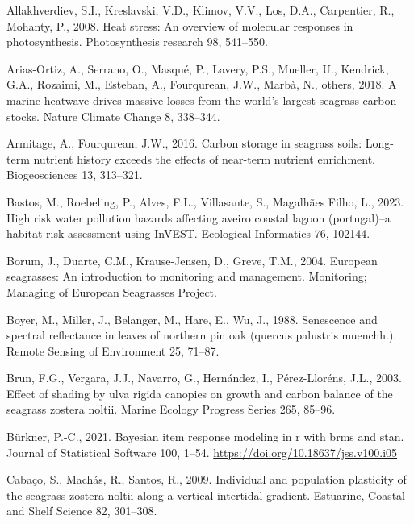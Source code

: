 \documentclass[
  letterpaper,
  DIV=11,
  numbers=noendperiod]{scrartcl}
\newlength{\cslhangindent}
\newenvironment{CSLReferences}[2] %
 {\begin{list}{}{%
  \setlength{\itemindent}{0pt}
  \setlength{\leftmargin}{0pt}
  \setlength{\parsep}{0pt}
  \ifodd #1
   \setlength{\leftmargin}{\cslhangindent}
   \setlength{\itemindent}{-1\cslhangindent}
  \fi
  \setlength{\itemsep}{#2\baselineskip}}}
 {\end{list}}
\begin{document}
\label{refs}
\begin{CSLReferences}{1}{0}
Allakhverdiev, S.I., Kreslavski, V.D., Klimov, V.V., Los, D.A.,
Carpentier, R., Mohanty, P., 2008. Heat stress: An overview of molecular
responses in photosynthesis. Photosynthesis research 98, 541--550.

Arias-Ortiz, A., Serrano, O., Masqué, P., Lavery, P.S., Mueller, U.,
Kendrick, G.A., Rozaimi, M., Esteban, A., Fourqurean, J.W., Marbà, N.,
others, 2018. A marine heatwave drives massive losses from the world's
largest seagrass carbon stocks. Nature Climate Change 8, 338--344.

Armitage, A., Fourqurean, J.W., 2016. Carbon storage in seagrass soils:
Long-term nutrient history exceeds the effects of near-term nutrient
enrichment. Biogeosciences 13, 313--321.

Bastos, M., Roebeling, P., Alves, F.L., Villasante, S., Magalhães Filho,
L., 2023. High risk water pollution hazards affecting aveiro coastal
lagoon (portugal)--a habitat risk assessment using InVEST. Ecological
Informatics 76, 102144.

Borum, J., Duarte, C.M., Krause-Jensen, D., Greve, T.M., 2004. European
seagrasses: An introduction to monitoring and management. Monitoring;
Managing of European Seagrasses Project.

Boyer, M., Miller, J., Belanger, M., Hare, E., Wu, J., 1988. Senescence
and spectral reflectance in leaves of northern pin oak (quercus
palustris muenchh.). Remote Sensing of Environment 25, 71--87.

Brun, F.G., Vergara, J.J., Navarro, G., Hernández, I., Pérez-Lloréns,
J.L., 2003. Effect of shading by ulva rigida canopies on growth and
carbon balance of the seagrass zostera noltii. Marine Ecology Progress
Series 265, 85--96.

Bürkner, P.-C., 2021. Bayesian item response modeling in r with brms and
stan. Journal of Statistical Software 100, 1--54.
\url{https://doi.org/10.18637/jss.v100.i05}

Cabaço, S., Machás, R., Santos, R., 2009. Individual and population
plasticity of the seagrass zostera noltii along a vertical intertidal
gradient. Estuarine, Coastal and Shelf Science 82, 301--308.


\end{CSLReferences}
\end{document}
